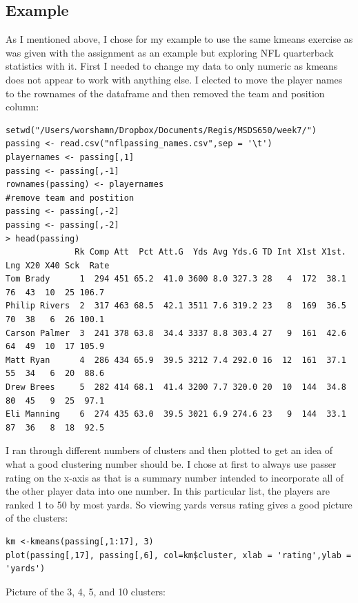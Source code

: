 \documentclass[10pt]{article}
\begin{document}
\subsection*{Example}
As I mentioned above, I chose for my example to use the same kmeans exercise as was given with the assignment as an example but exploring NFL quarterback statistics with it. First I needed to change my data to only numeric as kmeans does not appear to work with anything else. I elected to move the player names to the rownames of the dataframe and then removed the team and position column:
\begin{verbatim}
setwd("/Users/worshamn/Dropbox/Documents/Regis/MSDS650/week7/")
passing <- read.csv("nflpassing_names.csv",sep = '\t')
playernames <- passing[,1]
passing <- passing[,-1]
rownames(passing) <- playernames
#remove team and postition
passing <- passing[,-2]
passing <- passing[,-2]
> head(passing)
              Rk Comp Att  Pct Att.G  Yds Avg Yds.G TD Int X1st X1st. Lng X20 X40 Sck  Rate
Tom Brady      1  294 451 65.2  41.0 3600 8.0 327.3 28   4  172  38.1  76  43  10  25 106.7
Philip Rivers  2  317 463 68.5  42.1 3511 7.6 319.2 23   8  169  36.5  70  38   6  26 100.1
Carson Palmer  3  241 378 63.8  34.4 3337 8.8 303.4 27   9  161  42.6  64  49  10  17 105.9
Matt Ryan      4  286 434 65.9  39.5 3212 7.4 292.0 16  12  161  37.1  55  34   6  20  88.6
Drew Brees     5  282 414 68.1  41.4 3200 7.7 320.0 20  10  144  34.8  80  45   9  25  97.1
Eli Manning    6  274 435 63.0  39.5 3021 6.9 274.6 23   9  144  33.1  87  36   8  18  92.5
\end{verbatim}
I ran through different numbers of clusters and then plotted to get an idea of what a good clustering number should be. I chose at first to always use passer rating on the x-axis as that is a summary number intended to incorporate all of the other player data into one number. In this particular list, the players are ranked 1 to 50 by most yards. So viewing yards versus rating gives a good picture of the clusters:
\begin{verbatim}
km <-kmeans(passing[,1:17], 3)
plot(passing[,17], passing[,6], col=km$cluster, xlab = 'rating',ylab = 'yards')
\end{verbatim}
Picture of the 3, 4, 5, and 10 clusters:
\par
{}%
\end{document}
